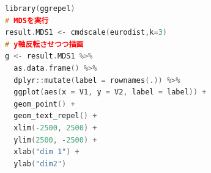 \begin{lstlisting}[language=C++,label={code:x15_01},caption={計量MDSの実践と描画}]
library(ggrepel)
# MDSを実行
result.MDS1 <- cmdscale(eurodist,k=3)
# y軸反転させつつ描画
g <- result.MDS1 %>%
  as.data.frame() %>%
  dplyr::mutate(label = rownames(.)) %>%
  ggplot(aes(x = V1, y = V2, label = label)) +
  geom_point() +
  geom_text_repel() +
  xlim(-2500, 2500) +
  ylim(2500, -2500) +
  xlab("dim 1") +
  ylab("dim2")
\end{lstlisting}
